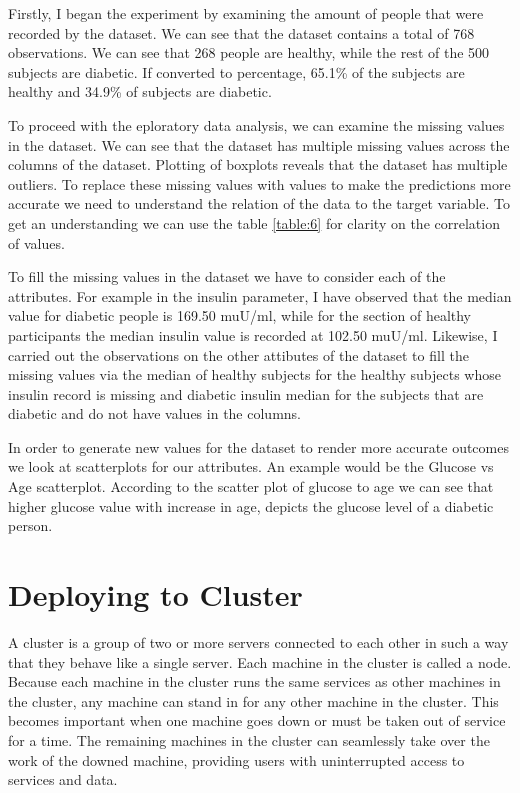 \documentclass[12pt]{article}
\begin{document}
Firstly, I began the experiment by examining the amount of people that were recorded by the dataset. We can see that the dataset contains a total of 768 observations. We can see that 268 people are healthy, while the rest of the 500 subjects are diabetic. If converted to percentage, 65.1\% of the subjects are healthy and 34.9\% of subjects are diabetic.

To proceed with the eploratory data analysis, we can examine the missing values in the dataset. We can see that the dataset has multiple missing values across the columns of the dataset. Plotting of boxplots reveals that the dataset has multiple outliers. To replace these missing values with values to make the predictions more accurate we need to understand the relation of the data to the target variable. To get an understanding we can use the table \ref{table:6} for clarity on the correlation of values.

To fill the missing values in the dataset we have to consider each of the attributes. For example in the insulin parameter, I have observed that the median value for diabetic people is 169.50 muU/ml, while for the section of healthy participants the median insulin value is recorded at 102.50 muU/ml. Likewise, I carried out the observations on the other attibutes of the dataset to fill the missing values via the median of healthy subjects for the healthy subjects whose insulin record is missing and diabetic insulin median for the subjects that are diabetic and do not have values in the columns.

In order to generate new values for the dataset to render more accurate outcomes we look at scatterplots for our attributes. An example would be the Glucose vs Age scatterplot. According to the scatter plot of glucose to age we can see that higher glucose value with increase in age, depicts the glucose level of a diabetic person. 


\newpage
\section{Deploying to Cluster}
A cluster is a group of two or more servers connected to each other in such a way that they behave like a single server. Each machine in the cluster is called a node. Because each machine in the cluster runs the same services as other machines in the cluster, any machine can stand in for any other machine in the cluster. This becomes important when one machine goes down or must be taken out of service for a time. The remaining machines in the cluster can seamlessly take over the work of the downed machine, providing users with uninterrupted access to services and data.
\end{document}
